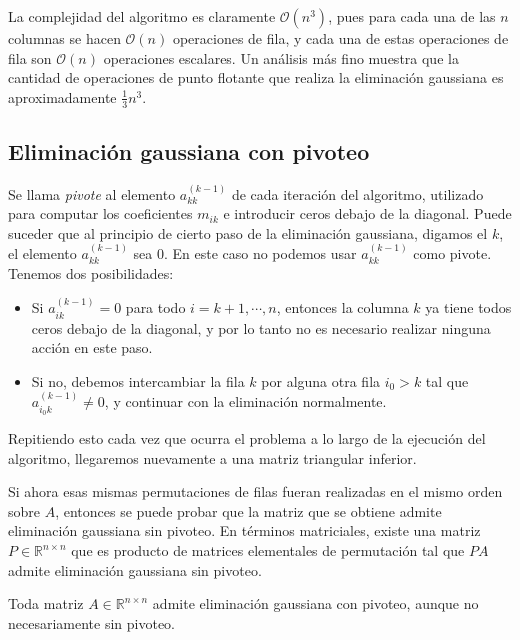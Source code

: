 La complejidad del algoritmo es claramente $\mathcal{O}(n^3)$, pues para cada una de las $n$ columnas se hacen $\mathcal{O}(n)$ operaciones de fila, y cada una de estas operaciones de fila son $\mathcal{O}(n)$ operaciones escalares. Un análisis más fino muestra que la cantidad de operaciones de punto flotante que realiza la eliminación gaussiana es aproximadamente $\frac{1}{3}n^3$.

\subsection{Eliminación gaussiana con pivoteo}

Se llama \textit{pivote} al elemento $a^{(k - 1)}_{kk}$ de cada iteración del algoritmo, utilizado para computar los coeficientes $m_{ik}$ e introducir ceros debajo de la diagonal. Puede suceder que al principio de cierto paso de la eliminación gaussiana, digamos el $k$, el elemento $a^{(k - 1)}_{kk}$ sea 0. En este caso no podemos usar $a^{(k-1)}_{kk}$ como pivote. Tenemos dos posibilidades:

\begin{itemize}
\item Si $a^{(k-1)}_{ik} = 0$ para todo $i = k + 1, \cdots, n$, entonces la columna $k$ ya tiene todos ceros debajo de la diagonal, y por lo tanto no es necesario realizar ninguna acción en este paso.
\item Si no, debemos intercambiar la fila $k$ por alguna otra fila $i_0 > k$ tal que $a^{(k-1)}_{i_0k} \neq 0$, y continuar con la eliminación normalmente.
\end{itemize}

Repitiendo esto cada vez que ocurra el problema a lo largo de la ejecución del algoritmo, llegaremos nuevamente a una matriz triangular inferior. 

\begin{obs}{
\label{obs:sistemas1}
Si ahora esas mismas permutaciones de filas fueran realizadas en el mismo orden sobre $A$, entonces se puede probar que la matriz que se obtiene admite eliminación gaussiana sin pivoteo. En términos matriciales, existe una matriz $P \in \mathbb{R}^{n \times n}$ que es producto de matrices elementales de permutación tal que $PA$ admite eliminación gaussiana sin pivoteo.
}\end{obs}

\begin{obs}{
Toda matriz $A \in \mathbb{R}^{n \times n}$ admite eliminación gaussiana con pivoteo, aunque no necesariamente sin pivoteo.
}\end{obs}

